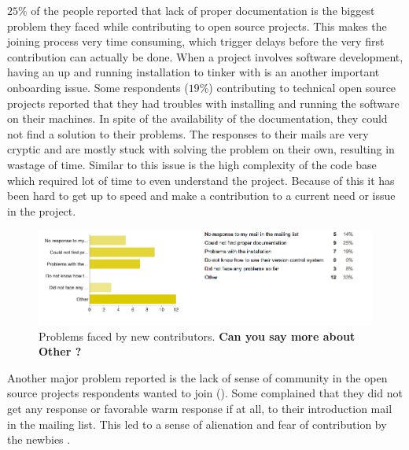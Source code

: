 $25\%$ of the people reported that lack of proper documentation is the biggest problem they faced while contributing to open source projects. This makes the joining process very time consuming, which trigger delays before the very first contribution can actually be done. When a project involves software development,  having an up and running installation to tinker with is an another important onboarding issue. Some respondents ($19\%$) contributing to technical open source projects reported that they had troubles with installing and running the software on their machines. In spite of the availability of the documentation, they could not find a solution to their problems. The responses to their mails are very cryptic and are mostly stuck with solving the problem on their own, resulting in wastage of time. Similar to this issue is the high complexity of the code base which required lot of time to even understand the project. Because of this it has been hard to get up to speed and make a contribution to a current need or issue in the project.

\begin{figure}[ht!]
\centering
\includegraphics[width=130mm]{chapters/img/problems_faced.png}
\caption{Problems faced by new contributors. {\bf Can you say more about Other ?}}
\label{fig:problem_faced}
\end{figure}

Another major problem reported is the lack of sense of community in the open source projects respondents wanted to join (). Some complained that they did not get any response or favorable warm response if at all, to their introduction mail in the mailing list. This led to a sense of alienation and fear of contribution by the newbies . 






